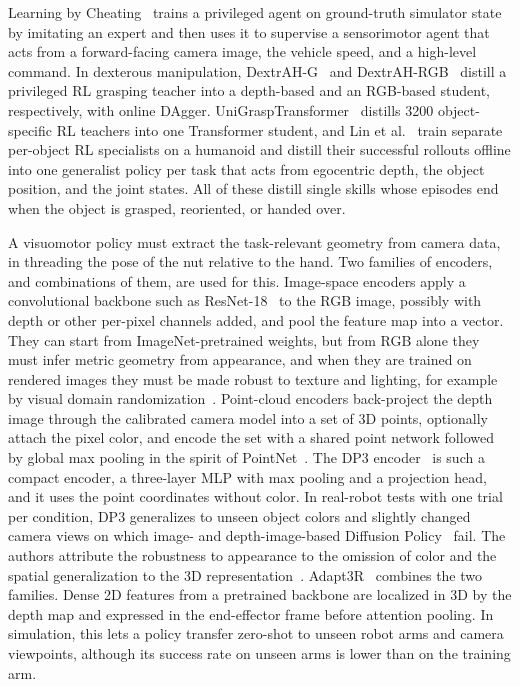 Learning by Cheating~\cite{Chen2020} trains a privileged agent on ground-truth simulator state by imitating an expert and then uses it to supervise a sensorimotor agent that acts from a forward-facing camera image, the vehicle speed, and a high-level command. In dexterous manipulation, DextrAH-G~\cite{Lum2024} and DextrAH-RGB~\cite{Singh2025} distill a privileged \ac{RL} grasping teacher into a depth-based and an RGB-based student, respectively, with online \ac{DAgger}. UniGraspTransformer~\cite{Wang2025} distills 3200 object-specific \ac{RL} teachers into one Transformer student, and Lin et al.~\cite{Lin2025} train separate per-object \ac{RL} specialists on a humanoid and distill their successful rollouts offline into one generalist policy per task that acts from egocentric depth, the object position, and the joint states. All of these distill single skills whose episodes end when the object is grasped, reoriented, or handed over.

A visuomotor policy must extract the task-relevant geometry from camera data, in threading the pose of the nut relative to the hand. Two families of encoders, and combinations of them, are used for this. Image-space encoders apply a convolutional backbone such as ResNet-18~\cite{He2016} to the RGB image, possibly with depth or other per-pixel channels added, and pool the feature map into a vector. They can start from ImageNet-pretrained weights, but from RGB alone they must infer metric geometry from appearance, and when they are trained on rendered images they must be made robust to texture and lighting, for example by visual domain randomization~\cite{Tobin2017}. Point-cloud encoders back-project the depth image through the calibrated camera model into a set of 3D points, optionally attach the pixel color, and encode the set with a shared point network followed by global max pooling in the spirit of PointNet~\cite{Qi2017}. The \ac{DP3} encoder~\cite{Ze2024} is such a compact encoder, a three-layer \ac{MLP} with max pooling and a projection head, and it uses the point coordinates without color. In real-robot tests with one trial per condition, \ac{DP3} generalizes to unseen object colors and slightly changed camera views on which image- and depth-image-based Diffusion Policy~\cite{Chi2024} fail. The authors attribute the robustness to appearance to the omission of color and the spatial generalization to the 3D representation~\cite{Ze2024}. Adapt3R~\cite{Wilcox2025} combines the two families. Dense 2D features from a pretrained backbone are localized in 3D by the depth map and expressed in the end-effector frame before attention pooling. In simulation, this lets a policy transfer zero-shot to unseen robot arms and camera viewpoints, although its success rate on unseen arms is lower than on the training arm.

